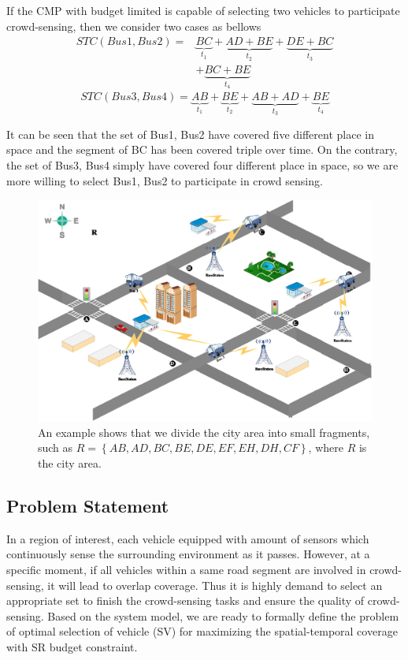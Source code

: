 \documentclass[journal]{IEEEtran}
\begin{document}
If the CMP with budget limited is capable of selecting two vehicles to participate crowd-sensing, then we consider two cases as bellows
\begin{equation}
\begin{aligned}
STC({Bus1,Bus2})=& \underset{t_{1}}{\underbrace{BC}}+\underset{t_{2}}{\underbrace{AD+BE}}+\underset{t_{3}}{\underbrace{DE+BC}}\\&+\underset{t_{4}}{\underbrace{BC+BE}}
\end{aligned}
\end{equation}
\begin{equation}
STC({Bus3,Bus4})= \underset{t_{1}}{\underbrace{AB}}+\underset{t_{2}}{\underbrace{BE}}+\underset{t_{3}}{\underbrace{AB+AD}}+\underset{t_{4}}{\underbrace{BE}}
\end{equation}

It can be seen that the set of {Bus1, Bus2} have covered five different place in space and the segment of {BC} has been covered triple over time. On the contrary, the set of {Bus3, Bus4} simply have covered four different place in space, so we are more willing to select {Bus1, Bus2} to participate in crowd sensing.
\begin{figure}[t]
	\centering
	\includegraphics[width=1\linewidth]{Fig2.png}
	\caption{An example shows that we divide the city area into small fragments, such as $R =\left \{ AB, AD, BC, BE, DE, EF, EH, DH, CF \right \}$, where $R$ is the city area.}
	\label{fig:figure4}
\end{figure}	
\subsection{Problem Statement} 
In a region of interest, each vehicle equipped with amount of sensors which continuously sense the surrounding environment as it passes. However, at a specific moment, if all vehicles within a same road segment are involved in crowd-sensing, it will lead to overlap coverage. Thus it is highly demand to select an appropriate set to finish the crowd-sensing tasks and ensure the quality of crowd-sensing. Based on the system model, we are ready to formally define the problem of optimal selection of vehicle (SV) for maximizing the spatial-temporal coverage with SR budget constraint.	
\end{document}
